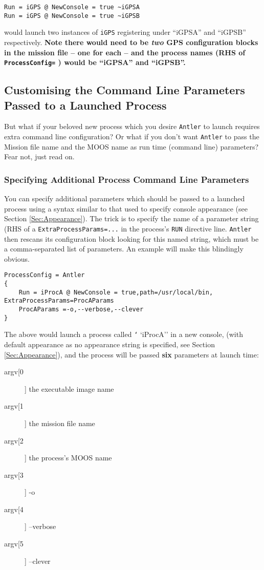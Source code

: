 \documentclass[a4paper,10pt]{article}
\newcommand{\Code}[1]{\texttt{#1} }
\newcommand{\code}[1]{\Code{#1} }
\begin{document}
\begin{lstlisting}
Run = iGPS @ NewConsole = true ~iGPSA
Run = iGPS @ NewConsole = true ~iGPSB
\end{lstlisting}

would launch two instances of \code{iGPS} registering under
``iGPSA'' and ``iGPSB'' respectively. {\textbf{Note there would need to be
\emph{two} GPS configuration blocks in the mission file -- one for
each -- and the process names  (RHS of \code{ProcessConfig=}) would be ``iGPSA'' and ``iGPSB''.}}





\subsection{Customising the Command Line Parameters Passed to a Launched Process}
But what if your beloved new process which you desire \code{Antler} to launch requires extra command line configuration? Or what if you don't want \code{Antler} to pass the Mission file name and the MOOS name as run time (command line) parameters? Fear not, just read on.

\subsubsection{Specifying Additional Process Command Line Parameters}

You can specify additional parameters which should be passed to a launched process using a syntax similar to that used to specify console appearance (see Section \ref{Sec:Appearance}). The trick is to specify the name of a parameter string (RHS of a \code{ExtraProcessParams=...} in the process's \code{RUN} directive line. \code{Antler} then rescans its configuration block looking for this named string, which must be a comma-separated list of parameters. An example will make this blindingly obvious.

\begin{lstlisting}
ProcessConfig = Antler
{
	Run = iProcA @ NewConsole = true,path=/usr/local/bin, ExtraProcessParams=ProcAParams
	ProcAParams =-o,--verbose,--clever
}
\end{lstlisting}

The above would launch a process called \code``iProcA'' in a new console, (with default appearance as no appearance string is specified, see Section \ref{Sec:Appearance}), and the process will be passed {\textbf{six}} parameters at launch time:
\begin{description}
\item [argv[0]] the executable image name
\item [argv[1]] the mission file name
\item [argv[2]] the process's MOOS name
\item [argv[3]] -o
\item [argv[4]] --verbose
\item [argv[5]] --clever
\end{description}
\end{document}
